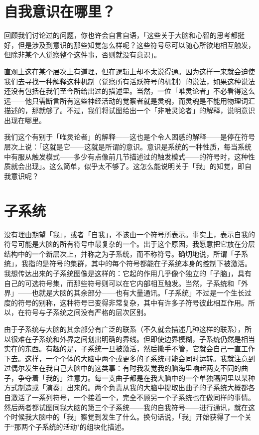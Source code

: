 \documentclass[
  12pt,
  twoside,
  openright,
  oldfontcommands,
]{memoir}
\begin{document}
\section{自我意识在哪里？}

回顾我们讨论过的问题，你也许会自言自语，「这些关于大脑和心智的思考都挺好，但是涉及到意识的那些知觉怎么样呢？这些符号尽可以随心所欲地相互触发，但除非某个人觉察整个这件事，否则就没有意识」。

直观上这在某个层次上有道理，但在逻辑上却不太说得通。因为这样一来就会迫使我们去寻找一种解释这种机制（觉察所有活跃符号的机制）的说法，如果这种说法还没有包括在我们至今所给出过的描述里。当然，一位「唯灵论者」不必看得这么远------他只需断言所有这些神经活动的觉察者就是灵魂，而灵魂是不能用物理词汇描述的，那就够了。不过，我们将试图给出一个「非唯灵论者」的解释，说明意识出现在哪里。

我们这个有别于「唯灵论者」的解释------这也是个令人困惑的解释------是停在符号层次上说：「这就是它------这就是所谓的意识。意识是系统的一种性质，每当系统中有服从触发模式------多少有点像前几节描述过的触发模式------的符号时，这种性质就会出现」。这么简单，似乎太不够了。这怎么能说明关于「我」的知觉，即自我意识呢？

\section{子系统}

没有理由期望「我」，或者「自我」，不该由一个符号所表示。事实上，表示自我的符号可能是大脑的所有符号中最复杂的一个。出于这个原因，我愿意把它放在分层结构中的一个新层次上，并称之为子系统，而不称符号。确切地说，所谓「子系统」，我指的是符号的集群，其中的每个符号都能在子系统本身的控制下被激活。我想传达出来的子系统图像是这样的：它起的作用几乎像个独立的「子脑」，具有自己的可选符号集，而那些符号则可以在它内部相互触发。当然，子系统和「外界」------也就是大脑的其余部分------也有大量通讯。「子系统」不过是一个生长过度的符号的别称，这种符号已变得非常复杂，其中有许多子符号彼此相互作用。所以，在符号与子系统之间没有严格的层次区别。

由于子系统与大脑的其余部分有广泛的联系（不久就会描述几种这样的联系），所以很难在子系统和外界之间划出明确的界线。但即使边界模糊，子系统仍然是相当实在的东西。有趣的是，子系统一旦被激活，然后撒手不管，它就会自己一直工作下去。这样，一个个体的大脑中两个或更多的子系统可能会同时运转。我就注意到过偶尔发生在我自己大脑中的这类事：有时我发觉我的脑海里响起两支不同的曲子，争夺着「我的」注意力。每一支曲子都是在我大脑中的一个单独隔间里以某种方式制造或「演奏」出来的。两个负责从我的大脑中提取出曲子的子系统大概都各自激活了一系列符号，一个接着一个，完全不顾另一个子系统也在做同样的事情。然后两者都试图同我大脑的第三个子系统------我的自我符号------进行通讯，就在这个时候我大脑中的「我」察觉到发生了什么。换句话说，「我」开始获得了一个关于``那两个子系统的活动"的组块化描述。
\end{document}
